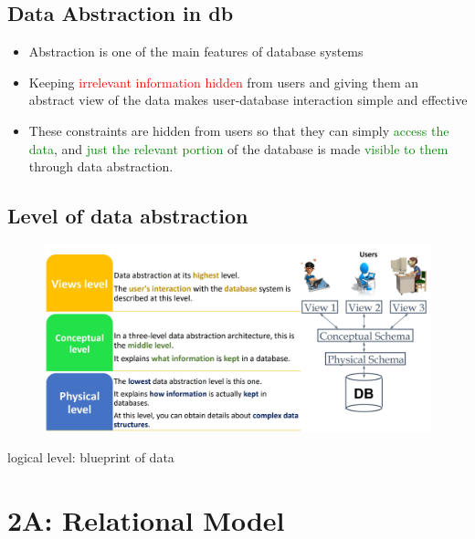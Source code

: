 \documentclass[a4paper, 12pt]{article}
\begin{document}
    \subsection{Data Abstraction in db}
        \begin{itemize}
            \item Abstraction is one of the main features of database systems
            \item Keeping \textcolor{red}{irrelevant information hidden} from users and giving them an
            abstract view of the data makes user-database interaction simple and
            effective
            \item These constraints are hidden from users so that they can simply \textcolor{green}{access
            the data}, and \textcolor{green}{just the relevant portion} of the database is made \textcolor{green}{visible
            to them} through data abstraction.
        \end{itemize}
    \subsection{Level of data abstraction}
    \begin{figure}[H]
        \includegraphics[width=\textwidth]{chapter1a_1.png}
    \end{figure}
    logical level: blueprint of data

\newpage
\section{2A: Relational Model}
\end{document}
